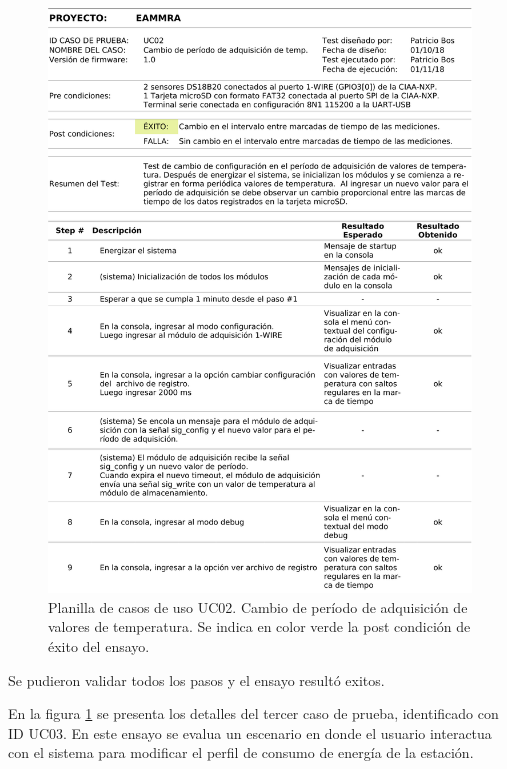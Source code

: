 \begin{figure}[!htb]
	\centering
	\includegraphics[width=1\textwidth]{./Figures/UseCase2_recortada.pdf}
	\caption{Planilla de casos de uso UC02.  Cambio de período de adquisición de valores de temperatura. Se indica en color verde la post condición de éxito del ensayo.}
	\label{fig:useCase2}
\end{figure}

Se pudieron validar todos los pasos y el ensayo resultó exitos.

En la figura \ref{fig:useCase2} se presenta los detalles del tercer caso de prueba, identificado con ID UC03.  En este ensayo se evalua un escenario en donde el usuario interactua con el sistema para modificar el perfil de consumo de energía de la estación. 

\vspace{10px}

